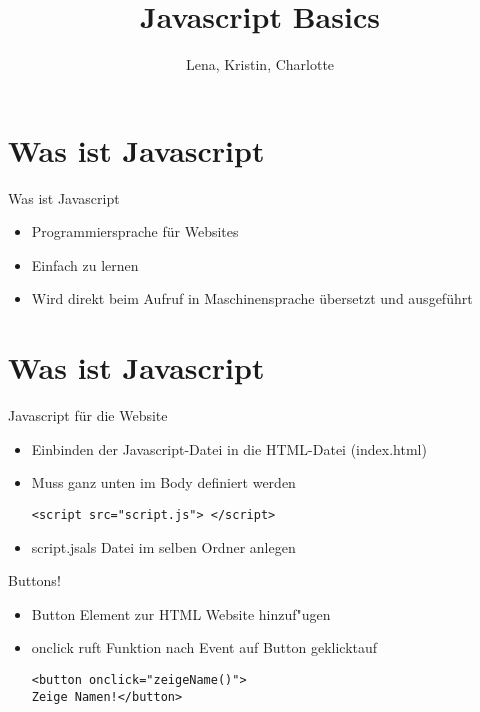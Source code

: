 \documentclass[18pt]{beamer}
\title[Javascript Basics]{Javascript Basics}
\author{Lena, Kristin, Charlotte}
\begin{document}

\begin{frame}
\titlepage
\end{frame}

\section {Was ist Javascript}
\begin{frame}{Was ist Javascript}
\begin {itemize}
\item Programmiersprache für Websites
\item Einfach zu lernen 
\item Wird direkt beim Aufruf in Maschinensprache übersetzt und ausgeführt
\end {itemize}
\end{frame}

\section {Was ist Javascript}
\begin{frame}[fragile]{Javascript für die Website}
\begin {itemize}
\item Einbinden der Javascript-Datei in die HTML-Datei (index.html)
\item Muss ganz unten im Body definiert werden
\begin{lstlisting}
<script src="script.js"> </script>
\end{lstlisting}
\item \glqq script.js\grqq als Datei im selben Ordner anlegen
\end {itemize}
\end{frame}


\begin{frame}[fragile]{Buttons!}
\begin {itemize}
\item Button Element zur HTML Website hinzuf"ugen
\item onclick ruft Funktion nach Event \glqq auf Button geklickt\grqq auf
\begin{lstlisting}
<button onclick="zeigeName()">
Zeige Namen!</button>
\end{lstlisting}
\end {itemize}
\end{frame}
\end{document}
